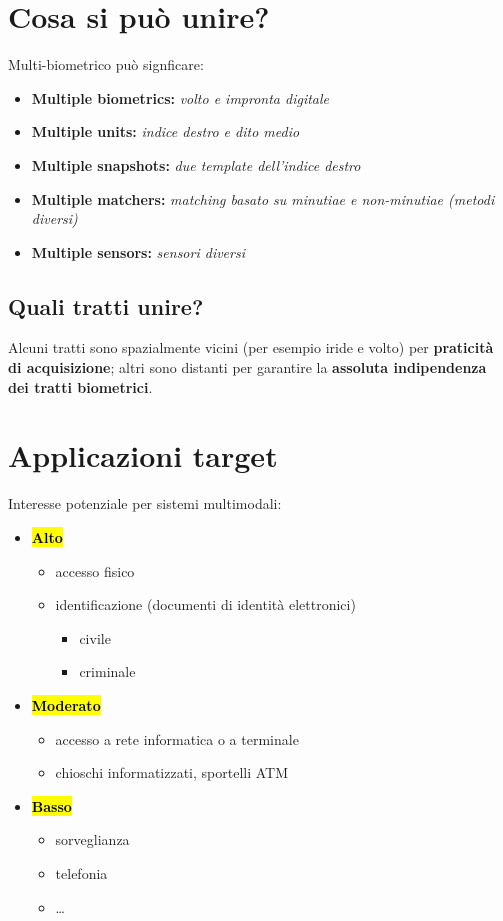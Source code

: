 \documentclass{report}
\begin{document}
\section{Cosa si può unire?}
Multi-biometrico può signficare:
\begin{itemize}
    \item \textbf{Multiple biometrics:} \textit{volto e impronta digitale}
    \item \textbf{Multiple units:} \textit{indice destro e dito medio}
    \item \textbf{Multiple snapshots:} \textit{due template dell'indice destro}
    \item \textbf{Multiple matchers:} \textit{matching basato su minutiae e non-minutiae (metodi diversi)}
    \item \textbf{Multiple sensors:} \textit{sensori diversi}
\end{itemize}

\subsection{Quali tratti unire?}
Alcuni tratti sono spazialmente vicini (per esempio iride e volto) per 
\textbf{praticità di acquisizione}; altri sono distanti per garantire la 
\textbf{assoluta indipendenza dei tratti biometrici}.

\section{Applicazioni target}
Interesse potenziale per sistemi multimodali:
\begin{itemize}
    \item \hl{\textbf{Alto}}
    \begin{itemize}
        \item accesso fisico
        \item identificazione (documenti di identità elettronici)
        \begin{itemize}
            \item civile
            \item criminale
        \end{itemize}
    \end{itemize}
    \item \hl{\textbf{Moderato}}
    \begin{itemize}
        \item accesso a rete informatica o a terminale 
        \item chioschi informatizzati, sportelli ATM 
    \end{itemize}
    \item \hl{\textbf{Basso}}
    \begin{itemize}
        \item sorveglianza
        \item telefonia
        \item \dots
    \end{itemize}
\end{itemize}
\end{document}
